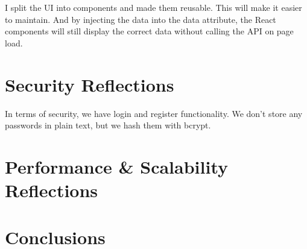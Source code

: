 \documentclass[letterpaper,twocolumn]{article}
\begin{document}
I split the UI into components and made them reusable.
This will make it easier to maintain.
And by injecting the data into the data attribute,
the React components will still display the correct data without calling the API on page load.

\section{Security Reflections}

In terms of security, we have login and register functionality.
We don't store any passwords in plain text, but we hash them with bcrypt.


\section{Performance \& Scalability Reflections}

\section{Conclusions}
\end{document}
